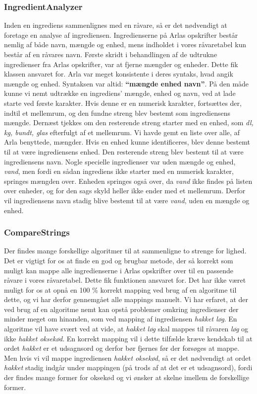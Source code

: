 \subsubsection{IngredientAnalyzer}
Inden en ingrediens sammenlignes med en råvare, så er det nødvendigt at foretage en analyse af ingrediensen. Ingredienserne på Arlas opskrifter består nemlig af både navn, mængde og enhed, mens indholdet i vores råvaretabel kun består af en råvares navn. Første skridt i behandlingen af de udtrukne ingredienser fra Arlas opskrifter, var at fjerne mængder og enheder. Dette fik klassen  ansvaret for. Arla var meget konsistente i deres syntaks, hvad angik mængde og enhed. Syntaksen var altid: \textbf{``mængde enhed navn''}.
På den måde kunne vi nemt udtrække en ingrediens' mængde, enhed og navn, ved at lade  starte ved første karakter. Hvis denne er en numerisk karakter, fortsættes der, indtil et mellemrum, og den fundne streng blev bestemt som ingrediensens mængde. Dernæst tjekkes om den resterende streng starter med en enhed, som \fx \textit{dl, kg, bundt, glas} efterfulgt af et mellemrum. Vi havde gemt en liste over alle, af Arla benyttede, mængder. Hvis en enhed kunne identificeres, blev denne bestemt til at være ingrediensens enhed. Den resterende streng blev bestemt til at være ingrediensens navn.
Nogle specielle ingredienser var uden mængde og enhed, \fx \textit{vand}, men fordi en sådan ingrediens ikke starter med en numerisk karakter, springes mængden over. Enheden springes også over, da \textit{vand} ikke findes på listen over enheder, og for den sags skyld heller ikke ender med et mellemrum. Derfor vil ingrediensens navn stadig blive bestemt til at være \textit{vand}, uden en mængde og enhed.

\subsubsection{CompareStrings}
Der findes mange forskellige algoritmer til at sammenligne to strenge for lighed. Det er vigtigt for os at finde en god og brugbar metode, der så korrekt som muligt kan mappe alle ingredienserne i Arlas opskrifter over til en passende råvare i vores råvaretabel. Dette fik funktionen  ansvaret for. Det har ikke været muligt for os at opnå en 100 \% korrekt mapping ved brug af en algoritme til dette, og vi har derfor gennemgået alle mappings manuelt. Vi har erfaret, at der ved brug af en algoritme nemt kan opstå problemer omkring ingredienser der minder meget om hinanden, som \fx ved mapping af ingrediensen \textit{hakket løg}. En algoritme vil have svært ved at vide, at \textit{hakket løg} skal mappes til råvaren \textit{løg} og ikke \textit{hakket oksekød}. En korrekt mapping vil i dette tilfælde kræve kendskab til at ordet \textit{hakket} er et udsagnsord og derfor bør fjernes før der forsøges at mappe. Men hvis vi vil mappe ingrediensen \textit{hakket oksekød}, så er det nødvendigt at ordet \textit{hakket} stadig indgår under mappingen (på trods af at det er et udsagnsord), fordi der findes mange former for oksekød og vi ønsker at skelne imellem de forskellige former.

